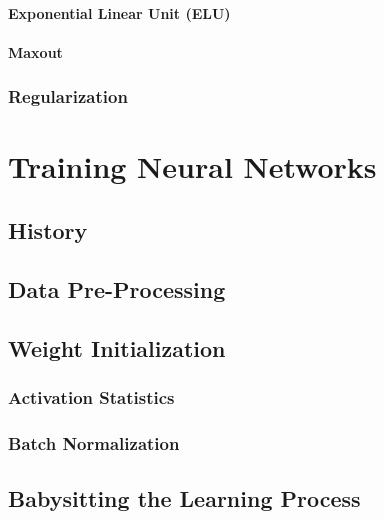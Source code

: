 			\subsubsection{Exponential Linear Unit (ELU)} %

			\subsubsection{Maxout} %

		\subsection{Regularization} %

\chapter{Training Neural Networks} %

	\section{History} %

	\section{Data Pre-Processing} %

	\section{Weight Initialization} %

		\subsection{Activation Statistics} %

		\subsection{Batch Normalization} %

	\section{Babysitting the Learning Process} %

